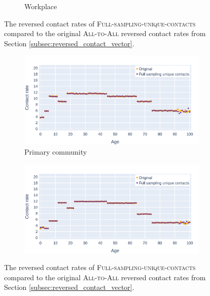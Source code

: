 \begin{figure}
\begin{subfigure}{.8\linewidth}
        \caption{Workplace}
        \label{fig:fsuc_vs_standard_reversed_cr_workplace}
    \end{subfigure}
    \caption{The reversed contact rates of \textsc{Full-sampling-unique-contacts} compared to the original \textsc{All-to-All} reversed contact rates from Section \ref{subsec:reversed_contact_vector}.}
\end{figure}
\begin{figure}\ContinuedFloat
    \centering
    \begin{subfigure}{.8\linewidth}
        \centering
        \includegraphics[width=\textwidth]{4 - Sampling/fig/full_sampling_unique_contacts/fsuc_vs_standard_reverse_cr_primary.png}
        \caption{Primary community}
        \label{fig:fsuc_vs_standard_reversed_cr_primary}
    \end{subfigure}
    \begin{subfigure}{.8\linewidth}
        \centering
        \includegraphics[width=\textwidth]{4 - Sampling/fig/full_sampling_unique_contacts/fsuc_vs_standard_reverse_cr_secondary.png}
        \label{fig:fsuc_vs_standard_reversed_cr_secondary}
    \end{subfigure}
    \caption{The reversed contact rates of \textsc{Full-sampling-unique-contacts} compared to the original \textsc{All-to-All} reversed contact rates from Section \ref{subsec:reversed_contact_vector}.}
    \label{fig:fsuc_vs_standard_reversed_cr}
\end{figure}


